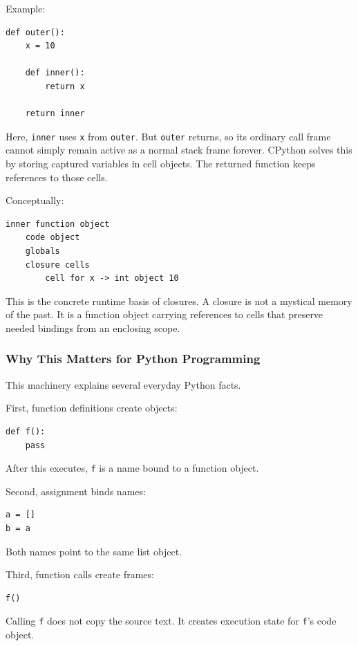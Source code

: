 Example:

\begin{verbatim}
def outer():
    x = 10

    def inner():
        return x

    return inner
\end{verbatim}

Here, \texttt{inner} uses \texttt{x} from \texttt{outer}. But \texttt{outer} returns, so its ordinary call frame cannot simply remain active as a normal stack frame forever. CPython solves this by storing captured variables in cell objects. The returned function keeps references to those cells.

Conceptually:

\begin{verbatim}
inner function object
    code object
    globals
    closure cells
        cell for x -> int object 10
\end{verbatim}

This is the concrete runtime basis of closures. A closure is not a mystical memory of the past. It is a function object carrying references to cells that preserve needed bindings from an enclosing scope.

\subsubsection{Why This Matters for Python Programming}

This machinery explains several everyday Python facts.

First, function definitions create objects:

\begin{verbatim}
def f():
    pass
\end{verbatim}

After this executes, \texttt{f} is a name bound to a function object.

Second, assignment binds names:

\begin{verbatim}
a = []
b = a
\end{verbatim}

Both names point to the same list object.

Third, function calls create frames:

\begin{verbatim}
f()
\end{verbatim}

Calling \texttt{f} does not copy the source text. It creates execution state for \texttt{f}'s code object.

